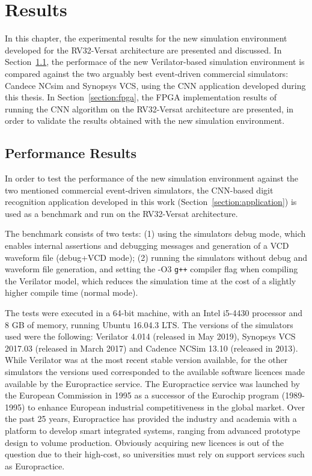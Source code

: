 \chapter{Results}
\label{chapter:results}

In this chapter, the experimental results for the new simulation environment
developed for the RV32-Versat architecture are presented and discussed. In
Section~\ref{section:benchmark}, the performace of the new Verilator-based
simulation environment is compared against the two arguably best event-driven
commercial simulators: Candece NCsim and Synopsys VCS, using the
\ac{CNN} application developed during this thesis. In
Section~\ref{section:fpga}, the \ac{FPGA} implementation results of running the
\ac{CNN} algorithm on the RV32-Versat architecture are presented, in order to
validate the results obtained with the new simulation environment.

\section{Performance Results}
\label{section:benchmark}

In order to test the performance of the new simulation environment against the
two mentioned commercial event-driven simulators, the CNN-based digit recognition
application developed in this work (Section~\ref{section:application}) is used as a 
benchmark and run on the RV32-Versat architecture.

The benchmark consists of two tests: (1) using the simulators debug mode, which
enables internal assertions and debugging messages and generation of a \ac{VCD}
waveform file (debug+\ac{VCD} mode); (2) running the simulators without debug and
waveform file generation, and setting the -O3 {\tt g++} compiler flag when
compiling the Verilator model, which reduces the simulation time at the cost of
a slightly higher compile time (normal mode).

The tests were executed in a 64-bit machine, with an Intel i5-4430 processor and
8 GB of memory, running Ubuntu 16.04.3 LTS. The versions of the simulators used
were the following: Verilator 4.014 (released in May 2019), Synopsys VCS 2017.03
(released in March 2017) and Cadence NCSim 13.10 (released in 2013). While
Verilator was at the most recent stable version available, for the other
simulators the versions used corresponded to the available software licences
made available by the Europractice service. The Europractice service was
launched by the European Commission in 1995 as a successor of the Eurochip
program (1989-1995) to enhance European industrial competitiveness in the global
market. Over the past 25 years, Europractice has provided the industry and
academia with a platform to develop smart integrated systems, ranging from
advanced prototype design to volume production. Obviously acquiring new licences
is out of the question due to their high-cost, so universities must rely on
support services such as Europractice.

